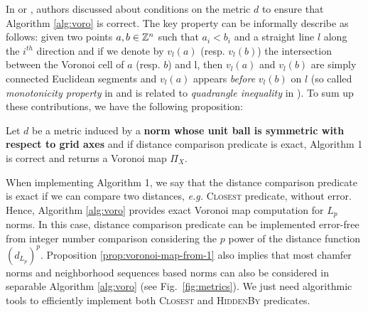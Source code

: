 \documentclass{llncs}
\begin{document}
In \cite{Hirata1996} or \cite{maurer_pami}, authors discussed about
conditions on the metric $d$ to ensure that Algorithm \ref{alg:voro}
is correct. The key property can be informally describe as follows:
given two points $a,b\in{\mathbb{Z}}^n$ such that $a_i<b_i$ and a straight line
$l$ along the $i^{th}$ direction and if we denote by $v_l(a)$
(resp. $v_l(b)$) the intersection between the Voronoi cell of $a$
(resp. $b$) and l, then $v_l(a)$ and $v_l(b)$ are simply connected
Euclidean segments and $v_l(a)$ appears \emph{before} $v_l(b)$ on $l$
(so called \emph{monotonicity property} in \cite{Maurer2003} and is
related to \emph{quadrangle inequality} in \cite{Hirata1996}).  To sum
up these contributions, we have the following proposition:
\begin{proposition}
\label{prop:voronoi-map-from-1}
  Let $d$ be a metric induced by a \textbf{norm whose unit ball is
    symmetric with respect to grid axes} and if distance comparison
  predicate is exact, Algorithm 1 is correct and returns a Voronoi map
  $\Pi_X$.
\end{proposition}
When implementing Algorithm 1, we say that the distance comparison
predicate is exact if we can compare two distances, \emph{e.g.}
\textsc{Closest} predicate, without error. Hence, Algorithm \ref{alg:voro}
provides exact Voronoi map computation for $L_p$ norms. In this case,
distance comparison predicate can be implemented error-free from
integer number comparison considering the $p$ power of the distance
function $\left (d_{L_p}\right)^p$.  Proposition
\ref{prop:voronoi-map-from-1} also implies that most chamfer norms and
neighborhood sequences based norms can also be considered in separable
Algorithm \ref{alg:voro} (see Fig.~\ref{fig:metrics}). We just need
algorithmic tools to efficiently implement both \textsc{Closest} and
\textsc{HiddenBy} predicates.
\end{document}
